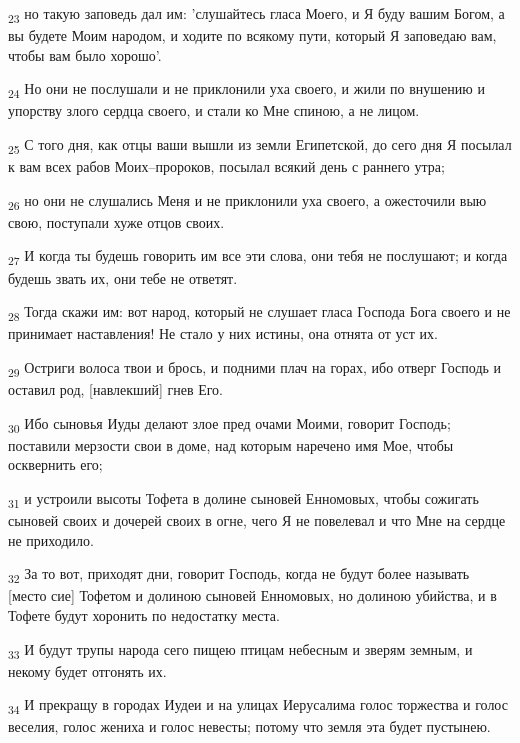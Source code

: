 \begin{tcolorbox}
\textsubscript{23} но такую заповедь дал им: 'слушайтесь гласа Моего, и Я буду вашим Богом, а вы будете Моим народом, и ходите по всякому пути, который Я заповедаю вам, чтобы вам было хорошо'.
\end{tcolorbox}
\begin{tcolorbox}
\textsubscript{24} Но они не послушали и не приклонили уха своего, и жили по внушению и упорству злого сердца своего, и стали ко Мне спиною, а не лицом.
\end{tcolorbox}
\begin{tcolorbox}
\textsubscript{25} С того дня, как отцы ваши вышли из земли Египетской, до сего дня Я посылал к вам всех рабов Моих--пророков, посылал всякий день с раннего утра;
\end{tcolorbox}
\begin{tcolorbox}
\textsubscript{26} но они не слушались Меня и не приклонили уха своего, а ожесточили выю свою, поступали хуже отцов своих.
\end{tcolorbox}
\begin{tcolorbox}
\textsubscript{27} И когда ты будешь говорить им все эти слова, они тебя не послушают; и когда будешь звать их, они тебе не ответят.
\end{tcolorbox}
\begin{tcolorbox}
\textsubscript{28} Тогда скажи им: вот народ, который не слушает гласа Господа Бога своего и не принимает наставления! Не стало у них истины, она отнята от уст их.
\end{tcolorbox}
\begin{tcolorbox}
\textsubscript{29} Остриги волоса твои и брось, и подними плач на горах, ибо отверг Господь и оставил род, [навлекший] гнев Его.
\end{tcolorbox}
\begin{tcolorbox}
\textsubscript{30} Ибо сыновья Иуды делают злое пред очами Моими, говорит Господь; поставили мерзости свои в доме, над которым наречено имя Мое, чтобы осквернить его;
\end{tcolorbox}
\begin{tcolorbox}
\textsubscript{31} и устроили высоты Тофета в долине сыновей Енномовых, чтобы сожигать сыновей своих и дочерей своих в огне, чего Я не повелевал и что Мне на сердце не приходило.
\end{tcolorbox}
\begin{tcolorbox}
\textsubscript{32} За то вот, приходят дни, говорит Господь, когда не будут более называть [место сие] Тофетом и долиною сыновей Енномовых, но долиною убийства, и в Тофете будут хоронить по недостатку места.
\end{tcolorbox}
\begin{tcolorbox}
\textsubscript{33} И будут трупы народа сего пищею птицам небесным и зверям земным, и некому будет отгонять их.
\end{tcolorbox}
\begin{tcolorbox}
\textsubscript{34} И прекращу в городах Иудеи и на улицах Иерусалима голос торжества и голос веселия, голос жениха и голос невесты; потому что земля эта будет пустынею.
\end{tcolorbox}
